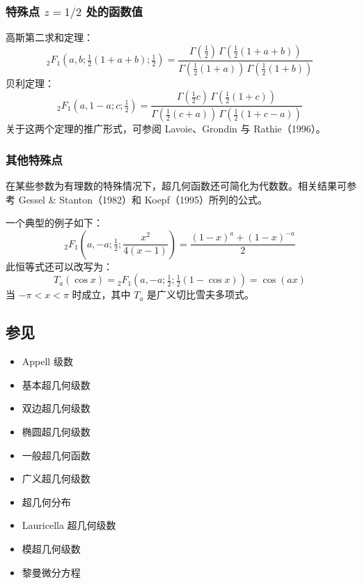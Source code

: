 \subsubsection{特殊点 $z = 1/2$ 处的函数值}
高斯第二求和定理：
$$
{}_2F_1\left(a, b; \tfrac{1}{2}(1 + a + b); \tfrac{1}{2} \right)
=
\frac{
\Gamma\left(\tfrac{1}{2}\right)\, \Gamma\left(\tfrac{1}{2}(1 + a + b)\right)
}{
\Gamma\left(\tfrac{1}{2}(1 + a)\right)\, \Gamma\left(\tfrac{1}{2}(1 + b)\right)}~
$$
贝利定理：
$$
{}_2F_1\left(a, 1 - a; c; \tfrac{1}{2} \right)
=
\frac{
\Gamma\left(\tfrac{1}{2}c\right)\, \Gamma\left(\tfrac{1}{2}(1 + c)\right)
}{
\Gamma\left(\tfrac{1}{2}(c + a)\right)\, \Gamma\left(\tfrac{1}{2}(1 + c - a)\right)}~
$$
关于这两个定理的推广形式，可参阅 Lavoie、Grondin 与 Rathie（1996）。
\subsubsection{其他特殊点}
在某些参数为有理数的特殊情况下，超几何函数还可简化为代数数。相关结果可参考 Gessel & Stanton（1982）和 Koepf（1995）所列的公式。

一个典型的例子如下：
$$
{}_2F_1\left(a, -a; \tfrac{1}{2}; \frac{x^2}{4(x - 1)}\right)
=
\frac{(1 - x)^a + (1 - x)^{-a}}{2}~
$$
此恒等式还可以改写为：
$$
T_a(\cos x)
=
{}_2F_1\left(a, -a; \tfrac{1}{2}; \tfrac{1}{2}(1 - \cos x)\right)
=
\cos(ax)~
$$
当 $-\pi < x < \pi$ 时成立，其中 $T_a$ 是广义切比雪夫多项式。
\subsection{参见}
\begin{itemize}
\item Appell 级数
\item 基本超几何级数
\item 双边超几何级数
\item 椭圆超几何级数
\item 一般超几何函数
\item 广义超几何级数
\item 超几何分布
\item Lauricella 超几何级数
\item 模超几何级数
\item 黎曼微分方程
\end{itemize}
